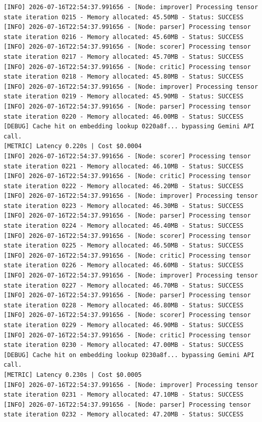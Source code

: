 \documentclass[10pt,journal,compsoc]{IEEEtran}
\begin{document}
\begin{verbatim}
[INFO] 2026-07-16T22:54:37.991656 - [Node: improver] Processing tensor state iteration 0215 - Memory allocated: 45.50MB - Status: SUCCESS
[INFO] 2026-07-16T22:54:37.991656 - [Node: parser] Processing tensor state iteration 0216 - Memory allocated: 45.60MB - Status: SUCCESS
[INFO] 2026-07-16T22:54:37.991656 - [Node: scorer] Processing tensor state iteration 0217 - Memory allocated: 45.70MB - Status: SUCCESS
[INFO] 2026-07-16T22:54:37.991656 - [Node: critic] Processing tensor state iteration 0218 - Memory allocated: 45.80MB - Status: SUCCESS
[INFO] 2026-07-16T22:54:37.991656 - [Node: improver] Processing tensor state iteration 0219 - Memory allocated: 45.90MB - Status: SUCCESS
[INFO] 2026-07-16T22:54:37.991656 - [Node: parser] Processing tensor state iteration 0220 - Memory allocated: 46.00MB - Status: SUCCESS
[DEBUG] Cache hit on embedding lookup 0220a8f... bypassing Gemini API call.
[METRIC] Latency 0.220s | Cost $0.0004
[INFO] 2026-07-16T22:54:37.991656 - [Node: scorer] Processing tensor state iteration 0221 - Memory allocated: 46.10MB - Status: SUCCESS
[INFO] 2026-07-16T22:54:37.991656 - [Node: critic] Processing tensor state iteration 0222 - Memory allocated: 46.20MB - Status: SUCCESS
[INFO] 2026-07-16T22:54:37.991656 - [Node: improver] Processing tensor state iteration 0223 - Memory allocated: 46.30MB - Status: SUCCESS
[INFO] 2026-07-16T22:54:37.991656 - [Node: parser] Processing tensor state iteration 0224 - Memory allocated: 46.40MB - Status: SUCCESS
[INFO] 2026-07-16T22:54:37.991656 - [Node: scorer] Processing tensor state iteration 0225 - Memory allocated: 46.50MB - Status: SUCCESS
[INFO] 2026-07-16T22:54:37.991656 - [Node: critic] Processing tensor state iteration 0226 - Memory allocated: 46.60MB - Status: SUCCESS
[INFO] 2026-07-16T22:54:37.991656 - [Node: improver] Processing tensor state iteration 0227 - Memory allocated: 46.70MB - Status: SUCCESS
[INFO] 2026-07-16T22:54:37.991656 - [Node: parser] Processing tensor state iteration 0228 - Memory allocated: 46.80MB - Status: SUCCESS
[INFO] 2026-07-16T22:54:37.991656 - [Node: scorer] Processing tensor state iteration 0229 - Memory allocated: 46.90MB - Status: SUCCESS
[INFO] 2026-07-16T22:54:37.991656 - [Node: critic] Processing tensor state iteration 0230 - Memory allocated: 47.00MB - Status: SUCCESS
[DEBUG] Cache hit on embedding lookup 0230a8f... bypassing Gemini API call.
[METRIC] Latency 0.230s | Cost $0.0005
[INFO] 2026-07-16T22:54:37.991656 - [Node: improver] Processing tensor state iteration 0231 - Memory allocated: 47.10MB - Status: SUCCESS
[INFO] 2026-07-16T22:54:37.991656 - [Node: parser] Processing tensor state iteration 0232 - Memory allocated: 47.20MB - Status: SUCCESS

\end{verbatim}
\end{document}

